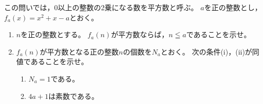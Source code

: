 \documentclass[../../main.tex]{subfiles}
\begin{document}
この問いでは，0以上の整数の2乗になる数を平方数と呼ぶ。
$a$を正の整数とし，$f_a(x)=x^2+x-a$とおく。
\begin{enumerate}
  \item$n$を正の整数とする。
    $f_a(n)$が平方数ならば，$n \leqq a$であることを示せ。
  \item$f_a(n)$が平方数となる正の整数$n$の個数を$N_a$とおく。
    次の条件(i)，(ii)が同値であることを示せ。
    \begin{enumerate}
      \item$N_a=1$である。
      \item$4a+1$は素数である。
    \end{enumerate}
\end{enumerate}
\end{document}
